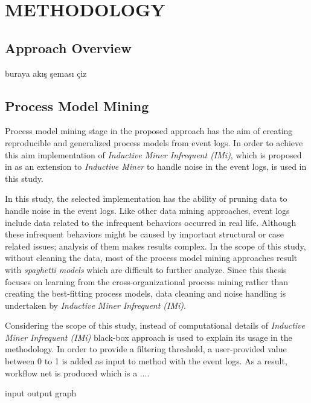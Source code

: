 \chapter{METHODOLOGY}
\label{chp:methodology}


\section{Approach Overview}
\label{sec:approach-overview}
buraya akış şeması çiz

\section{Process Model Mining}
\label{sec:process-model-mining}

Process model mining stage in the proposed approach has the aim of creating reproducible and generalized process models from event logs. In order to achieve this aim implementation of \textit{Inductive Miner Infrequent (IMi)}, which is proposed in \cite{leemans2014discoveringinfrequent} as an extension to \textit{Inductive Miner} to handle noise in the event logs, is used in this study. 

In this study, the selected implementation has the ability of pruning data to handle noise in the event logs. Like other data mining approaches, event logs include data related to the infrequent behaviors occurred in real life. Although these infrequent behaviors might be caused by important structural or case related issues; analysis of them makes results complex. In the scope of this study, without cleaning the data, most of the process model mining approaches result with \textit{spaghetti models} which are difficult to further analyze. Since this thesis focuses on learning from the cross-organizational process mining rather than creating the best-fitting process models, data cleaning and noise handling is undertaken by \textit{Inductive Miner Infrequent (IMi)}.


Considering the scope of this study, instead of computational details of \textit{Inductive Miner Infrequent (IMi)} black-box approach is used to explain its usage in the methodology. In order to provide a filtering threshold, a user-provided value between 0 to 1 is added as input to method with the event logs. As a result, workflow net is produced which is a ....

input output graph



